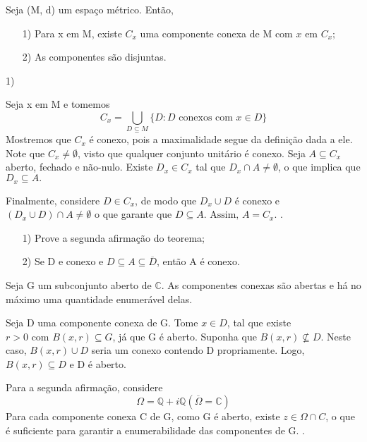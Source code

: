 \documentclass[complex.tex]{subfiles}
\begin{document}
\begin{theorem*}
	Seja (M, d) um espaço métrico. Então,
	\begin{itemize}
		\item[1)] Para x em M, existe $C _{x}$ uma componente conexa de M com $x\text{ em }C _{x}; $
		\item[2)] As componentes são disjuntas.
	\end{itemize}
\end{theorem*}
\begin{proof*}
	1) \par Seja x em M e tomemos
	$$
		C _{x} = \bigcup _{D\subseteq{M}} \{D: D \text{ conexos com } x\in{D}\}
	$$
	Mostremos que $C _{x}$ é conexo, pois a maximalidade segue da definição dada a ele. Note que $C _{x}\neq\emptyset$, visto que
	qualquer conjunto unitário é conexo. Seja $A\subseteq{C _{x}}$ aberto, fechado e não-nulo. Existe $D _{x}\in C _{x}$ tal
	que $D _{x}\cap{A}\neq\emptyset$, o que implica que $D _{x}\subseteq{A}.$

	Finalmente, considere $D\in C _{x}$, de modo que $D _{x}\cup{D}$ é conexo e $(D _{x}\cup{D})\cap{A}\neq\emptyset$ o que garante
	que $D\subseteq{A}. \text{ Assim, } A = C _{x}.$
	\qedsymbol.
\end{proof*}
\begin{exer*}
	\begin{itemize}
		\item[1)] Prove a segunda afirmação do teorema;
		\item[2)] Se D e conexo e $D\subseteq{A}\subseteq{\overline{D}}$, então A é conexo.
	\end{itemize}
\end{exer*}

\begin{theorem*}
	Seja G um subconjunto aberto de $\mathbb{C}.$ As componentes conexas são abertas e há no máximo uma quantidade enumerável
	delas.
\end{theorem*}
\begin{proof*}
	Seja D uma componente conexa de G. Tome $x\in{D}$, tal que existe $r > 0 \text{ com } B(x, r)\subseteq{G}$, já que G é aberto.
	Suponha que $B(x, r)\not\subseteq{D}.$ Neste caso, $B(x, r)\cup{D}$ seria um conexo contendo D propriamente. Logo,
	$B(x, r)\subseteq{D}$ e D é aberto.

	Para a segunda afirmação, considere
	$$
		\Omega = \mathbb{Q} + i\mathbb{Q} (\overline{\Omega} = \mathbb{C})
	$$
	Para cada componente conexa C de G, como G é aberto, existe $z\in{\Omega\cap{C}}$, o que é suficiente para garantir a enumerabilidade
	das componentes de G.
	\qedsymbol.
\end{proof*}
\end{document}
